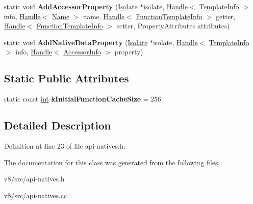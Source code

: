 \begin{DoxyCompactItemize}
\item 
\mbox{\label{classv8_1_1internal_1_1ApiNatives_a6934eedf60bf86e845fd9f483839191c}} 
static void {\bfseries Add\+Accessor\+Property} (\mbox{\hyperlink{classv8_1_1internal_1_1Isolate}{Isolate}} $\ast$isolate, \mbox{\hyperlink{classv8_1_1internal_1_1Handle}{Handle}}$<$ \mbox{\hyperlink{classv8_1_1internal_1_1TemplateInfo}{Template\+Info}} $>$ info, \mbox{\hyperlink{classv8_1_1internal_1_1Handle}{Handle}}$<$ \mbox{\hyperlink{classv8_1_1internal_1_1Name}{Name}} $>$ name, \mbox{\hyperlink{classv8_1_1internal_1_1Handle}{Handle}}$<$ \mbox{\hyperlink{classv8_1_1internal_1_1FunctionTemplateInfo}{Function\+Template\+Info}} $>$ getter, \mbox{\hyperlink{classv8_1_1internal_1_1Handle}{Handle}}$<$ \mbox{\hyperlink{classv8_1_1internal_1_1FunctionTemplateInfo}{Function\+Template\+Info}} $>$ setter, Property\+Attributes attributes)
\item 
\mbox{\label{classv8_1_1internal_1_1ApiNatives_aa3f534fe84b42a099d7af3d7dae423c5}} 
static void {\bfseries Add\+Native\+Data\+Property} (\mbox{\hyperlink{classv8_1_1internal_1_1Isolate}{Isolate}} $\ast$isolate, \mbox{\hyperlink{classv8_1_1internal_1_1Handle}{Handle}}$<$ \mbox{\hyperlink{classv8_1_1internal_1_1TemplateInfo}{Template\+Info}} $>$ info, \mbox{\hyperlink{classv8_1_1internal_1_1Handle}{Handle}}$<$ \mbox{\hyperlink{classv8_1_1internal_1_1AccessorInfo}{Accessor\+Info}} $>$ property)
\end{DoxyCompactItemize}
\subsection*{Static Public Attributes}
\begin{DoxyCompactItemize}
\item 
\mbox{\label{classv8_1_1internal_1_1ApiNatives_aca69c9efcc2949a8eb362d0fe599b4b9}} 
static const \mbox{\hyperlink{classint}{int}} {\bfseries k\+Initial\+Function\+Cache\+Size} = 256
\end{DoxyCompactItemize}


\subsection{Detailed Description}


Definition at line 23 of file api-\/natives.\+h.



The documentation for this class was generated from the following files\+:\begin{DoxyCompactItemize}
\item 
v8/src/api-\/natives.\+h\item 
v8/src/api-\/natives.\+cc\end{DoxyCompactItemize}
